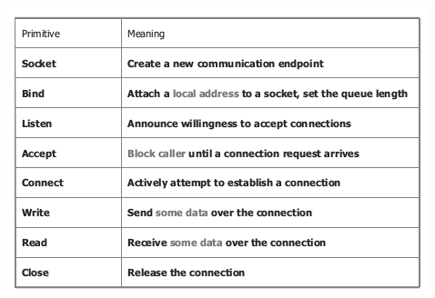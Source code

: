 \documentclass[a4paper,12pt, oneside]{book}
\begin{document}
\begin{center}
\includegraphics[scale=3]{img/sc3.png}
\end{center}
\end{document}
